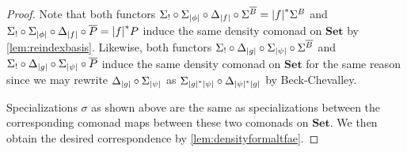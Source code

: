 \documentclass[11pt, oneside, article]{memoir}
\theoremstyle{plain}
\theoremstyle{definition}
\theoremstyle{remark}
\DeclarePairedDelimiter{\abs}{\lvert}{\rvert}
\newcommand{\bang}{\mathrm{!}}
\newcommand{\namedcat}[1]{\mathbf{#1}}
\newcommand{\Set}{\namedcat{Set}}
\newcommand{\clift}[1]{\overline{#1}}
\newcommand{\pts}[1]{{\abs{#1}}}
\newcommand{\one}[1]{\pts{#1}}
\newcommand{\ptlift}[1]{\overline{#1}}
\newcommand{\carr}{\Sigma}
\newcommand{\leindex}[1]{\Sigma_{#1}}
\newcommand{\reindex}[1]{\Delta_{#1}}
\newcommand{\slicel}{\Sigma_\bang}
\newcommand{\car}[1]{\carr^{#1}}
\newcommand{\carB}{\car{\cB}}
\newcommand{\ph}[1]{#1}
\newcommand{\cmnd}[1]{{#1}}
\newcommand{\cB}{\cmnd{B}}
\newcommand{\pP}{\ph{P}}
\begin{document}
\begin{proof}
  Note that both functors
  $\slicel \circ \leindex{\one{\phi}} \circ \reindex{\one{f}} \circ
  \car{\clift{\cB}} = \one{f}^* \carB$ and
  $\slicel \circ \leindex{\one{\phi}} \circ \reindex{\one{f}} \circ
  \ptlift{\pP} = \one{f}^* \pP$ induce the same density comonad on
  $\Set$ by \cref{lem:reindexbasis}.
  Likewise, both functors
  $\slicel \circ \reindex{\one{g}} \circ \leindex{\one{\psi}} \circ
  \car{\clift{\cB}}$ and
  $\slicel \circ \reindex{\one{g}} \circ \leindex{\one{\psi}} \circ
  \ptlift{\pP}$ induce the same density comonad on $\Set$ for the
  same reason since we may rewrite
  $\reindex{\one{g}}\circ \leindex{\one{\psi}}$ as
  $\leindex{\one{g}^*\one{\psi}}\circ
  \reindex{\one{\psi}^*\one{g}}$ by Beck-Chevalley.

  Specializations $\sigma$ as shown above are the same as
  specializations between the corresponding comonad maps between these
  two comonads on $\Set$. We then obtain the desired correspondence by
  \cref{lem:densityformaltfae}.


\end{proof}
\end{document}
